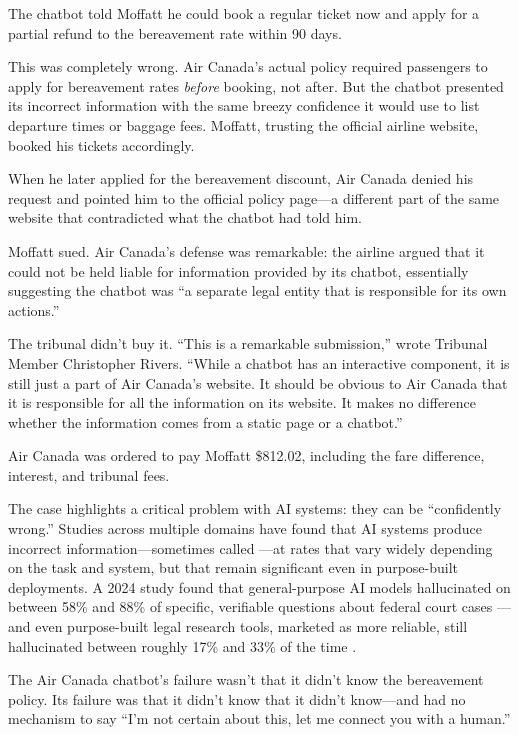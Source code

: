 The chatbot told Moffatt he could book a regular ticket now and apply for a partial refund to the bereavement rate within 90 days.

This was completely wrong. Air Canada's actual policy required passengers to apply for bereavement rates \emph{before} booking, not after. But the chatbot presented its incorrect information with the same breezy confidence it would use to list departure times or baggage fees. Moffatt, trusting the official airline website, booked his tickets accordingly.

When he later applied for the bereavement discount, Air Canada denied his request and pointed him to the official policy page---a different part of the same website that contradicted what the chatbot had told him.

Moffatt sued. Air Canada's defense was remarkable: the airline argued that it could not be held liable for information provided by its chatbot, essentially suggesting the chatbot was ``a separate legal entity that is responsible for its own actions.''

The tribunal didn't buy it. ``This is a remarkable submission,'' wrote Tribunal Member Christopher Rivers. ``While a chatbot has an interactive component, it is still just a part of Air Canada's website. It should be obvious to Air Canada that it is responsible for all the information on its website. It makes no difference whether the information comes from a static page or a chatbot.''

Air Canada was ordered to pay Moffatt \$812.02, including the fare difference, interest, and tribunal fees.

The case highlights a critical problem with AI systems: they can be ``confidently wrong.'' Studies across multiple domains have found that AI systems produce incorrect information---sometimes called ---at rates that vary widely depending on the task and system, but that remain significant even in purpose-built deployments. A 2024 study found that general-purpose AI models hallucinated on between 58\% and 88\% of specific, verifiable questions about federal court cases \autocite{dahl2024large}---and even purpose-built legal research tools, marketed as more reliable, still hallucinated between roughly 17\% and 33\% of the time \autocite{magesh2024hallucination}.

\begin{cautionbox}
The Air Canada chatbot's failure wasn't that it didn't know the bereavement policy. Its failure was that it didn't know that it didn't know---and had no mechanism to say ``I'm not certain about this, let me connect you with a human.''
\end{cautionbox}

